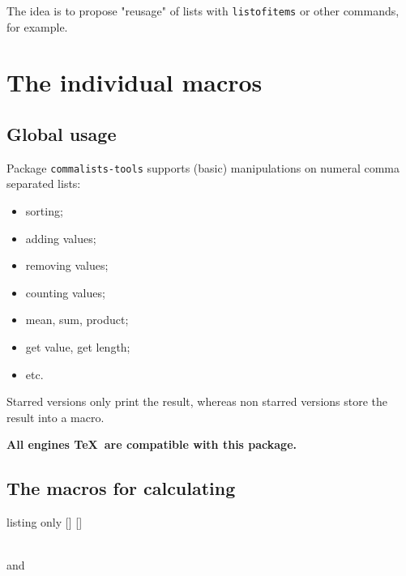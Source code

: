 \documentclass[11pt,a4paper]{ltxdoc}
\begin{document}
\smallskip

The idea is to propose "reusage" of lists with \texttt{listofitems} or other commands, for example.

\section{The individual macros}

\subsection{Global usage}

Package \texttt{commalists-tools} supports (basic) manipulations on numeral comma separated lists:

\begin{itemize}
	\item sorting;
	\item adding values;
	\item removing values;
	\item counting values;
	\item mean, sum, product;
	\item get value, get length;
	\item etc.
\end{itemize}

Starred versions only print the result, whereas non starred versions store the result into a macro.

\medskip

\hfill\textbf{All engines \TeX\ are compatible with this package.}\hfill~

\subsection{The macros for calculating}

\begin{DemoCode}{listing only}
[\macro]
[\macro]
\end{DemoCode}

\begin{DemoCode}{}
\\
 and 
\end{DemoCode}
\end{document}
